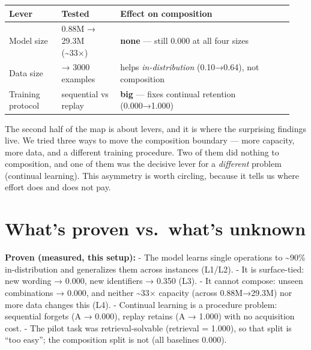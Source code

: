\begin{longtable}[]{@{}
  >{\raggedright\arraybackslash}p{0.1731\linewidth}
>{\raggedright\arraybackslash}p{0.1979\linewidth}
>{\raggedright\arraybackslash}p{0.5690\linewidth}
@{}}
\toprule\noalign{}
\begin{minipage}[b]{\linewidth}\raggedright
Lever
\end{minipage} & \begin{minipage}[b]{\linewidth}\raggedright
Tested
\end{minipage} & \begin{minipage}[b]{\linewidth}\raggedright
Effect on composition
\end{minipage} \\
\midrule\noalign{}
\endhead
\bottomrule\noalign{}
\endlastfoot
Model size & 0.88M → 29.3M (\textasciitilde33×) & \textbf{none} ---
still 0.000 at all four sizes \\
Data size & 100 → 3000 examples & helps \emph{in-distribution}
(0.10→0.64), not composition \\
Training protocol & sequential vs replay & \textbf{big} --- fixes
continual retention (0.000→1.000) \\
\end{longtable}

The second half of the map is about levers, and it is where the
surprising findings live. We tried three ways to move the composition
boundary --- more capacity, more data, and a different training
procedure. Two of them did nothing to composition, and one of them was
the decisive lever for a \emph{different} problem (continual learning).
This asymmetry is worth circling, because it tells us where effort does
and does not pay.

\section{What's proven vs.~what's
unknown}\label{whats-proven-vs.-whats-unknown}

\textbf{Proven (measured, this setup):} - The model learns single
operations to \textasciitilde90\% in-distribution and generalizes them
across instances (L1/L2). - It is surface-tied: new wording → 0.000, new
identifiers → 0.350 (L3). - It cannot compose: unseen combinations →
0.000, and neither \textasciitilde33× capacity (across 0.88M→29.3M) nor
more data changes this (L4). - Continual learning is a procedure
problem: sequential forgets (A → 0.000), replay retains (A → 1.000) with
no acquisition cost. - The pilot task was retrieval-solvable (retrieval
= 1.000), so that split is ``too easy''; the composition split is not
(all baselines 0.000).


